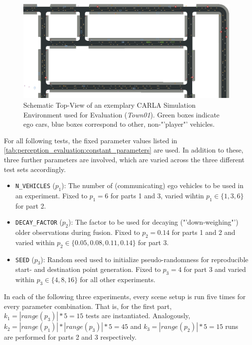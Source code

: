 \begin{figure}
	\centering
	\includegraphics[width=1\linewidth]{98_images/evaluation_scene_topview_cropped}
	\caption[Top-View of the Simulation Environment used for Evaluation]{Schematic Top-View of an exemplary CARLA Simulation Environment used for Evaluation (\textit{Town01}). Green boxes indicate ego cars, blue boxes correspond to other, non-"'player"' vehicles.}
	\label{fig:carla_scene_topview}
\end{figure}

For all following tests, the fixed parameter values listed in \cref{tab:perception_evaluation:constant_parameters} are used. In addition to these, three further parameters are involved, which are varied across the three different test sets accordingly. 

\begin{itemize}
	\item \texttt{N\_VEHICLES} ($p_1$): The number of (communicating) ego vehicles to be used in an experiment. Fixed to $p_1 = 6$ for parts 1 and 3, varied wihtin $p_1 \in \{1, 3, 6\}$ for part 2.
	\item \texttt{DECAY\_FACTOR} ($p_2$): The factor to be used for decaying ("'down-weighing"') older observations during fusion. Fixed to $p_2 = 0.14$ for parts 1 and 2 and varied within $p_2 \in \{0.05, 0.08, 0.11, 0.14\}$ for part 3.
	\item \texttt{SEED} ($p_3$): Random seed used to initialize pseudo-randomness for reproducible start- and destination point generation. Fixed to $p_3 = 4$ for part 3 and varied within $p_3 \in \{4, 8, 16\}$ for all other experiments.
\end{itemize}

In each of the following three experiments, every scene setup is run five times for every parameter combination. That is, for the first part, $k_1 = |\textit{range}(p_3)| * 5 = 15$ tests are instantiated. Analogously, $k_2 = |\textit{range}(p_1)| * |\textit{range}(p_3)| * 5 = 45$ and $k_3 = |\textit{range}(p_2)| * 5 = 15$ runs are performed for parts 2 and 3 respectively.
\par
\bigskip


